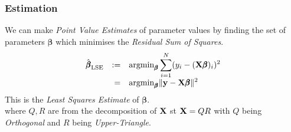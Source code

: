 \documentclass[11pt,a4paper]{article}
\begin{document}
\subsubsection{Estimation}

We can make \textit{Point Value Estimates} of parameter values by finding the set of parameters $\pmb\beta$ which minimises the \textit{Residual Sum of Squares}.
\[\begin{array}{rrl}
\hat{\pmb\beta}_\text{LSE}&:=&\displaystyle{\text{argmin}_{\pmb\beta}\sum_{i=1}^N(y_i-(\textbf{X}\pmb\beta)_i)^2}\\
&=&\displaystyle{\text{argmin}_{\pmb\beta}\|\textbf{y}-\textbf{X}\pmb\beta\|^2}
\end{array}\]
\nb This is the \textit{Least Squares Estimate} of $\pmb\beta$.\\

where $Q,R$ are from the decomposition of $\textbf{X}$ st $\textbf{X}=QR$ with $Q$ being \textit{Orthogonal} and $R$ being \textit{Upper-Triangle}.\\
\end{document}
